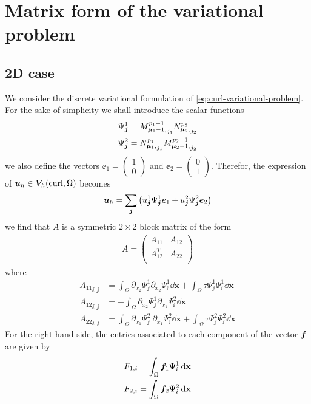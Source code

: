 \section{Matrix form of the variational problem}

\subsection{2D case}
We consider the discrete variational formulation of \eqref{eq:curl-variational-problem}. 
For the sake of simplicity we shall introduce the scalar functions
\begin{align*}
  \Psi^1_{\bm{j}} = {M_{\boldsymbol{\mu}_1-1,}^{p_1-1}}_{j_1} {N_{\boldsymbol{\mu}_2,}^{p_2}}_{j_2} 
  \\
  \Psi^2_{\bm{j}} = {N_{\boldsymbol{\mu}_1,}^{p_1}}_{j_1} {M_{\boldsymbol{\mu}_2-1,}^{p_2-1}}_{j_2}  
\end{align*}
we also define the vectors $\ee_1 = \begin{pmatrix} 1 \\ 0 \end{pmatrix}$ and $\ee_2 = \begin{pmatrix} 0 \\ 1 \end{pmatrix}$. Therefor, the expression of $\bm{u}_h \in \bm{V}_h(\mbox{curl}, \Omega)$ becomes
\begin{align*}
  \bm{u}_h = \sum\limits_{\bm{j}} \left( 
    u_{\bm{j}}^1 \Psi^1_{\bm{j}} \bm{e}_1 
  + u_{\bm{j}}^2 \Psi^2_{\bm{j}} \bm{e}_2 
  \right)
\end{align*}
we find that $A$ is a symmetric $2\times 2$ block matrix of the form
\begin{align}
  A = 
  \begin{pmatrix}
    A_{11}   & A_{12} \\
    A_{12}^T & A_{22} \\
  \end{pmatrix}
\end{align}
where
\begin{align*}
  {A_{11}}_{\ii, \jj} &=   \int_{\Omega} 
         \partial_{x_2} \Psi^{1}_{\jj} \partial_{x_2} \Psi^{1}_{\ii}
        \dd \mathbf{x} 
                       +   \int_{\Omega} 
                       \tau \Psi^{1}_{\jj} \Psi^{1}_{\ii} 
        \dd \mathbf{x} 
  \\
  {A_{12}}_{\ii, \jj} &= - \int_{\Omega} 
          \partial_{x_2} \Psi^{1}_{\jj} \partial_{x_1} \Psi^{2}_{\ii}
        \dd \mathbf{x} 
  \\
  {A_{22}}_{\ii, \jj} &=   \int_{\Omega} 
        \partial_{x_1} \Psi^{2}_{\jj} ~ \partial_{x_1} \Psi^{2}_{\ii}
        \dd \mathbf{x} 
                       +   \int_{\Omega} 
                       \tau \Psi^{2}_{\jj} \Psi^{2}_{\ii} 
        \dd \mathbf{x} 
\end{align*}
For the right hand side, the entries associated to each component of the vector $\bm{f}$ are given by
\begin{align*}
    F_{1, i} & = \int_{\Omega} \bm{f}_1 \Psi^1_{i} \,{\rm d} \mathbf{x} \\
    F_{2, i} & = \int_{\Omega} \bm{f}_2 \Psi^2_{i} \,{\rm d} \mathbf{x} \\
\end{align*}
